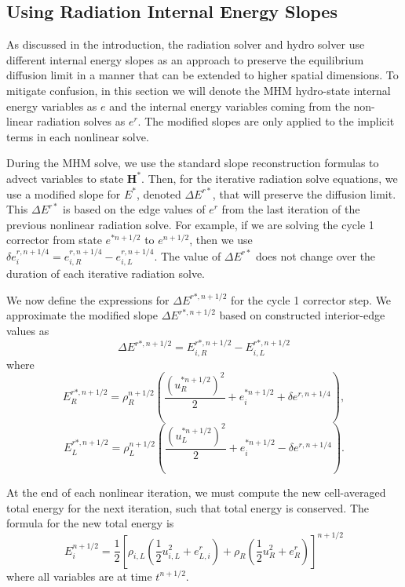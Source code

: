 \documentclass[preprint,12pt]{elsarticle}
\renewcommand{\H}{\mathbf{H}}
\begin{document}
\subsection{Using Radiation Internal Energy Slopes}
\label{sec:e_slopes}

As discussed in the introduction, the radiation solver and hydro solver use different
internal energy slopes as an approach to preserve the equilibrium diffusion limit in a
manner that can be extended to higher spatial dimensions.
To mitigate confusion, in this section we will denote the MHM hydro-state internal energy variables as $e$ and
the internal energy variables coming from the non-linear radiation solves as $e^r$.  The modified slopes are only applied to the implicit terms in each
nonlinear solve.

During the MHM solve, we
use the standard slope reconstruction formulas to advect variables to
state $\H^*$.  Then, for the iterative radiation
solve equations, we use a modified slope for $E^*$, denoted $\Delta E^{r*}$, that will preserve the diffusion
limit.  This $\Delta E^{r*}$ is based on the edge values of $e^r$ from the last iteration of the previous
nonlinear radiation solve.  For example, if we are solving the cycle 1 corrector from
state $e^{*n+1/2}$ to
$e^{n+1/2}$, then we use $\delta e_i^{r,n+1/4}=e^{r,n+1/4}_{i,R} - e^{r,n+1/4}_{i,L}$.  The value of $\Delta
E^{r*}$ does not change over the duration of each iterative radiation solve.

We now define the expressions for $\Delta E^{r*,n+1/2}$ for the cycle 1 corrector step.  We
approximate the modified slope $\Delta E^{r*,n+1/2}$ based on constructed interior-edge
values as
\begin{equation}
    \Delta E^{r*,n+1/2} = E^{r*,n+1/2}_{i,R} - E^{r*,n+1/2}_{i,L}
\end{equation}
where 
\begin{equation}\label{estarr}
    E^{r*,n+1/2}_R = \rho^{n+1/2}_R\left(\frac{(u_R^{*n+1/2})^2}{2} + e^{*n+1/2}_i +
    \delta e^{r,n+1/4}\right),
\end{equation}
\begin{equation}\label{estarl}
    E^{r*,n+1/2}_L = \rho^{n+1/2}_L\left(\frac{(u_L^{*n+1/2})^2}{2} + e^{*n+1/2}_i -
    \delta e^{r,n+1/4}\right).
\end{equation}

At the end of each nonlinear iteration, we must compute the new cell-averaged total energy
for the next iteration, such that total energy is conserved. The formula for the new total energy is
\begin{equation}\label{ei}
    E^{n+1/2}_i = \frac{1}{2}\left[\rho_{i,L}\left(\frac{1}{2}u_{i,L}^2 + e_{L,i}^r\right)
    +\rho_R\left(\frac{1}{2}u_R^2 + e_R^r\right)\right]^{n+1/2}
\end{equation}
where all variables are at time $t^{n+1/2}$. 
\end{document}
